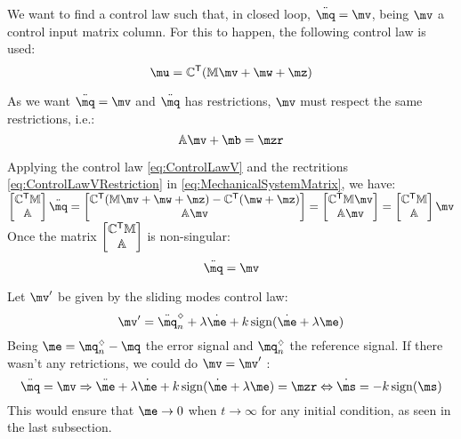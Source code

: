 We want to find a control law such that, in closed loop, $ \ddot{\mq} = \mv $, being $\mv$ a control input matrix column. For this to happen, the following control law is used:
\begin{equation} \label{eq:ControlLawV}
\mu = \mC^\msT ( \mM \mv + \mw + \mz )
\end{equation}

As we want $ \ddot{\mq} = \mv $ and $\ddot{\mq}$ has restrictions, $\mv$ must respect the same restrictions, i.e.:
\begin{equation} \label{eq:ControlLawVRestriction}
\mA \mv + \mb = \mzr
\end{equation}

Applying the control law \eqref{eq:ControlLawV} and the rectritions \eqref{eq:ControlLawVRestriction} in \eqref{eq:MechanicalSystemMatrix}, we have: \\

$ \begin{bmatrix}
\mC^\msT \mM \\
\mA
\end{bmatrix}
\ddot{\mq}
=
\begin{bmatrix}
\mC^\msT ( \mM \mv + \mw + \mz ) - \mC^\msT(\mw + \mz) \\
\mA \mv
\end{bmatrix}
=
\begin{bmatrix}
\mC^\msT  \mM \mv \\
\mA \mv
\end{bmatrix}
=
\begin{bmatrix}
\mC^\msT \mM \\
\mA
\end{bmatrix}
\mv $ \\

Once the matrix $\begin{bmatrix} \mathbb{C}^{\mathsf{T}} \mathbb{M} \\ \mathbb{A} \end{bmatrix}$ is non-singular:
\begin{equation} \label{eq:ClosedLoopV}
\ddot{\mq} = \mv
\end{equation}

Let $\mv'$ be given by the sliding modes control law:
\begin{equation} \label{eq:SMControlowLasV1'}
\mv' = \ddot{\mq}_{n}^\sdia + \lambda \dot{\me} + k \sign (\dot{\me} + \lambda \me)
\end{equation}
Being $ \me = \mq_{n}^\sdia - \mq $ the error signal and $\mq_{n}^\sdia$ the reference signal. If there wasn't any retrictions, we could do $ \mv = \mv' $ :
$$ \ddot{\mq} = \mv \Rightarrow  \ddot{\me} + \lambda \dot{\me} + k \sign (\dot{\me} + \lambda \me) = \mzr \Leftrightarrow \dot{\ms} = - k \sign(\ms)$$
This would ensure that $\me \rightarrow 0$ when $t \rightarrow \infty$ for any initial condition, as seen in the last subsection. \\

